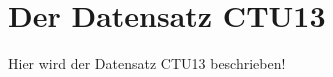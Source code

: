 \documentclass[main.tex]{subfiles}
\begin{document}
\section{Der Datensatz CTU13}

Hier wird der Datensatz CTU13 beschrieben!
\end{document}
